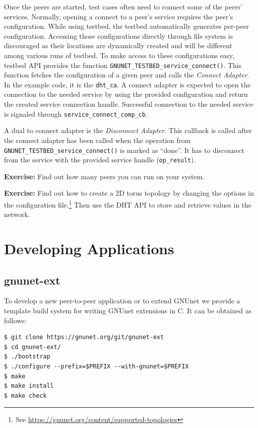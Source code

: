 \documentclass[10pt]{article}
\newcommand{\exercise}[1]{\noindent\begin{boxedminipage}{\textwidth}{\bf Exercise:} #1 \end{boxedminipage}}
\begin{document}
Once the peers are started, test cases often need to connect some of the peers'
services.  Normally, opening a connect to a peer's service requires the peer's
configuration.  While using testbed, the testbed automatically generates
per-peer configuration.  Accessing those configurations directly through file
system is discouraged as their locations are dynamically created and will be
different among various runs of testbed.  To make access to these configurations
easy, testbed API provides the function
\texttt{GNUNET\_TESTBED\_service\_connect()}.  This function fetches the
configuration of a given peer and calls the \textit{Connect Adapter}.
In the example code, it is the \texttt{dht\_ca}.  A connect adapter is expected
to open the connection to the needed service by using the provided configuration
and return the created service connection handle.  Successful connection to the
needed service is signaled through \texttt{service\_connect\_comp\_cb}.

A dual to connect adapter is the \textit{Disconnect Adapter}.  This callback is
called after the connect adapter has been called when the operation from
\texttt{GNUNET\_TESTBED\_service\_connect()} is marked as ``done''.  It has to
disconnect from the service with the provided service handle (\texttt{op\_result}).

\exercise{Find out how many peers you can run on your system.}

\exercise{Find out how to create a 2D torus topology by changing the
  options in the configuration file.\footnote{See \url{https://gnunet.org/content/supported-topologies}}
  Then use the DHT API to store and retrieve values in the
  network.}


\section{Developing Applications}

\subsection{gnunet-ext}
To develop a new peer-to-peer application or to extend GNUnet we provide
a template build system for writing GNUnet extensions in C. It can be
obtained as follows:

\lstset{language=bash}
\begin{lstlisting}
$ git clone https://gnunet.org/git/gnunet-ext
$ cd gnunet-ext/
$ ./bootstrap
$ ./configure --prefix=$PREFIX --with-gnunet=$PREFIX
$ make
$ make install
$ make check
\end{lstlisting}
\end{document}
